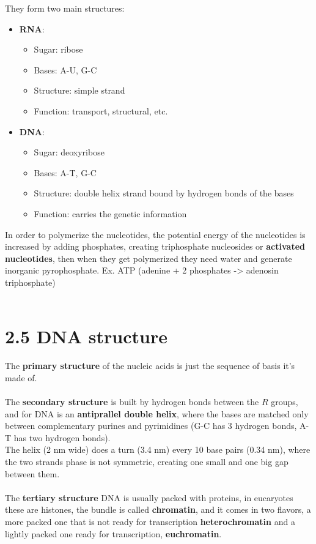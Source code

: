 \documentclass[a4paper,landscape,10pt]{cheatsheet}
\begin{document}
They form two main structures:
\begin{itemize}
      \item \textbf{RNA}:
            \begin{itemize}
                  \item Sugar: ribose
                  \item Bases: A-U, G-C
                  \item Structure: simple strand
                  \item Function: transport, structural, etc.
            \end{itemize}
      \item \textbf{DNA}:
            \begin{itemize}
                  \item Sugar: deoxyribose
                  \item Bases: A-T, G-C
                  \item Structure: double helix strand bound by hydrogen bonds of the bases
                  \item Function: carries the genetic information
            \end{itemize}
\end{itemize}

In order to polymerize the nucleotides, the potential energy of the nucleotides is increased by adding phosphates,
creating triphosphate nucleosides or \textbf{activated nucleotides}, then when they get polymerized they need water and
generate inorganic pyrophosphate. Ex. ATP (adenine + 2 phosphates -> adenosin triphosphate) \\

\hfil\\
\section*{2.5 DNA structure}
The \textbf{primary structure} of the nucleic acids is just the sequence of basis it's made of.\\
\hfill\\
The \textbf{secondary structure} is built by hydrogen bonds between the $R$ groups, and for DNA is an
\textbf{antiprallel double helix}, where the bases are matched only between complementary purines and pyrimidines (G-C
has 3 hydrogen bonds, A-T has two hydrogen bonds).\\
The helix (2 nm wide) does a turn (3.4 nm) every 10 base pairs (0.34 nm), where the two strands phase is not symmetric,
creating one small and one big gap between them.\\
\hfill\\
The \textbf{tertiary structure} DNA is usually packed with proteins, in eucaryotes these are histones, the bundle is
called \textbf{chromatin}, and it comes in two flavors, a more packed one that is not ready for transcription
\textbf{heterochromatin} and a lightly packed one ready for transcription, \textbf{euchromatin}.\\
\end{document}
